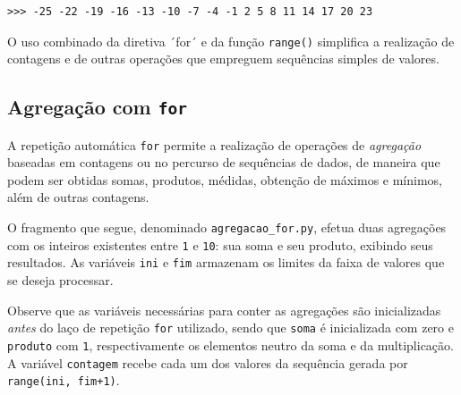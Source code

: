 \documentclass[
]{book}
\begin{document}
\begin{verbatim}
>>> -25 -22 -19 -16 -13 -10 -7 -4 -1 2 5 8 11 14 17 20 23
\end{verbatim}

O uso combinado da diretiva ´for´ e da função \texttt{range()} simplifica a realização de contagens e de outras operações que empreguem sequências simples de valores.

\hypertarget{repet-for-acumu}{%
\subsection{\texorpdfstring{Agregação com \texttt{for}}{Agregação com for}}\label{repet-for-acumu}}

A repetição automática \texttt{for} permite a realização de operações de \emph{agregação} baseadas em contagens ou no percurso de sequências de dados, de maneira que podem ser obtidas somas, produtos, médidas, obtenção de máximos e mínimos, além de outras contagens.

O fragmento que segue, denominado \texttt{agregacao\_for.py}, efetua duas agregações com os inteiros existentes entre \texttt{1} e \texttt{10}: sua soma e seu produto, exibindo seus resultados. As variáveis \texttt{ini} e \texttt{fim} armazenam os limites da faixa de valores que se deseja processar.

Observe que as variáveis necessárias para conter as agregações são inicializadas \emph{antes} do laço de repetição \texttt{for} utilizado, sendo que \texttt{soma} é inicializada com zero e \texttt{produto} com \texttt{1}, respectivamente os elementos neutro da soma e da multiplicação. A variável \texttt{contagem} recebe cada um dos valores da sequência gerada por \texttt{range(ini,\ fim+1)}.
\end{document}
